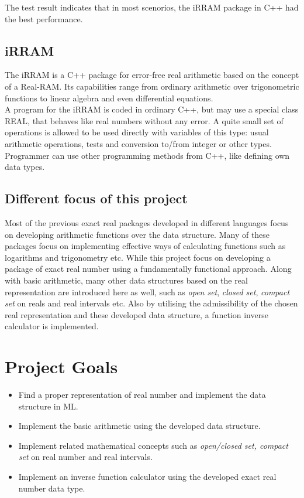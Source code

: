\documentclass[12pt,twoside,notitlepage]{report}
\begin{document}
The test result indicates that in most scenorios, the iRRAM package in C++ had the best performance.


\subsection{iRRAM}
The iRRAM is a C++ package for error-free real arithmetic based on the concept of a Real-RAM\cite{irram}. Its capabilities range from ordinary arithmetic over trigonometric functions to linear algebra and even differential equations.\\
A program for the iRRAM is coded in ordinary C++, but may use a special class REAL, that behaves like real numbers without any error. A quite small set of operations is allowed to be used directly with variables of this type: usual arithmetic operations, tests and conversion to/from integer or other types. Programmer can use other programming methods from C++, like defining own data types.

\subsection {Different focus of this project}
Most of the previous exact real packages developed in different languages focus on developing arithmetic functions over the data structure. Many of these packages focus on implementing effective ways of calculating functions such as logarithms and trigonometry etc. While this project focus on developing a package of exact real number using a fundamentally functional approach. Along with basic arithmetic, many other data structures based on the real representation are introduced here as well, such as \emph{open set}, \emph{closed set}, \emph{compact set} on reals and real intervals etc. Also by utilising the admissibility of the chosen real representation and these developed data structure, a function inverse calculator is implemented.  



\section {Project Goals}


\begin{itemize}
\item Find a proper representation of real number and implement the data structure in ML.
\item Implement the basic arithmetic using the developed data structure.
\item Implement related mathematical concepts such as \emph{open/closed set, compact set} on real number and real intervals.
\item Implement an inverse function calculator using the developed exact real number data type. 
\end{itemize}
\end{document}
